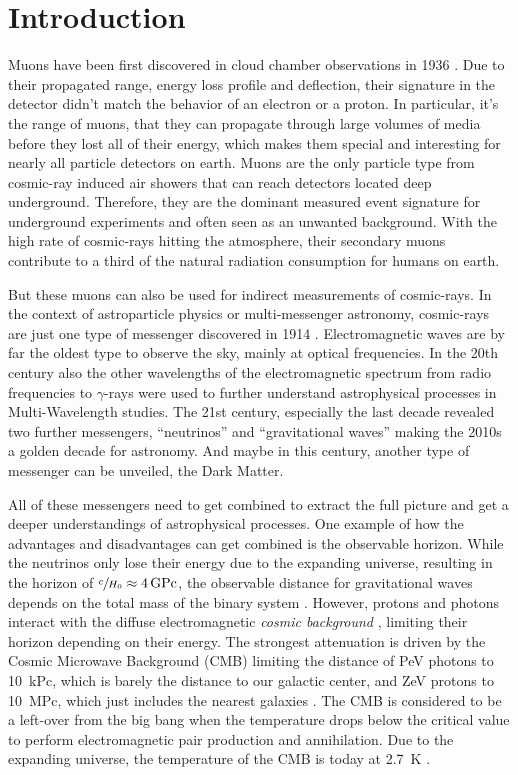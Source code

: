 \chapter{Introduction}

Muons have been first discovered in cloud chamber observations in 1936 \cite{Anderson36Muon}.
Due to their propagated range, energy loss profile and deflection, their signature in the detector didn't match the behavior of an electron or a proton.
In particular, it's the range of muons, that they can propagate through large volumes of media before they lost all of their energy, which makes them special and interesting for nearly all particle detectors on earth.
Muons are the only particle type from cosmic-ray induced air showers that can reach detectors located deep underground.
Therefore, they are the dominant measured event signature for underground experiments and often seen as an unwanted background.
With the high rate of cosmic-rays hitting the atmosphere, their secondary muons contribute to a third of the natural radiation consumption for humans on earth.

But these muons can also be used for indirect measurements of cosmic-rays.
In the context of astroparticle physics or multi-messenger astronomy, cosmic-rays are just one type of messenger discovered in 1914 \cite{Hess12CRbirth}.
Electromagnetic waves are by far the oldest type to observe the sky, mainly at optical frequencies.
In the 20th century also the other wavelengths of the electromagnetic spectrum from radio frequencies to $\gamma$-rays were used to further understand astrophysical processes in Multi-Wavelength studies.
The 21st century, especially the last decade revealed two further messengers, \enquote{neutrinos} and \enquote{gravitational waves} making the 2010s a golden decade for astronomy.
And maybe in this century, another type of messenger can be unveiled, the Dark Matter.

All of these messengers need to get combined to extract the full picture and get a deeper understandings of astrophysical processes.
One example of how the advantages and disadvantages can get combined is the observable horizon.
While the neutrinos only lose their energy due to the expanding universe, resulting in the horizon of $\sfrac{c}{H_0}\approx\SI{4}{GPc}$, the observable distance for gravitational waves depends on the total mass of the binary system \cite{LIGO20WhitePaper}.
However, protons and photons interact with the diffuse electromagnetic \textit{cosmic background} \cite{Hill18CosmicBg}, limiting their horizon depending on their energy.
The strongest attenuation is driven by the Cosmic Microwave Background (CMB) limiting the distance of PeV photons to \SI{10}{kPc}, which is barely the distance to our galactic center, and ZeV protons to \SI{10}{MPc}, which just includes the nearest galaxies \cite{DeAngelis13Horizon}.
The CMB is considered to be a left-over from the big bang when the temperature drops below the critical value to perform electromagnetic pair production and annihilation.
Due to the expanding universe, the temperature of the CMB is today at \SI{2.7}{K} \cite{PDG20}.

